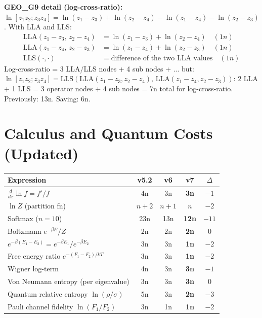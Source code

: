 \documentclass[11pt]{article}
\newcommand{\imp}[1]{\textcolor{imp}{\textbf{#1}}}
\begin{document}
\noindent \textbf{GEO\_G9 detail (log-cross-ratio):}
$\ln[z_1z_2;z_3z_4] = \ln(z_1-z_3) + \ln(z_2-z_4) - \ln(z_1-z_4) - \ln(z_2-z_3)$.
With LLA and LLS:
\begin{align*}
  \mathrm{LLA}(z_1-z_3,\, z_2-z_4) &= \ln(z_1-z_3) + \ln(z_2-z_4) \quad (1n) \\
  \mathrm{LLA}(z_1-z_4,\, z_2-z_3) &= \ln(z_1-z_4) + \ln(z_2-z_3) \quad (1n) \\
  \mathrm{LLS}(\cdot, \cdot) &= \text{difference of the two LLA values} \quad (1n)
\end{align*}
Log-cross-ratio = 3 LLA/LLS nodes + 4 sub nodes + ... but:
$\ln[z_1z_2;z_3z_4] = \mathrm{LLS}(\mathrm{LLA}(z_1-z_3, z_2-z_4),\, \mathrm{LLA}(z_1-z_4, z_2-z_3))$:
2 LLA + 1 LLS = 3 operator nodes + 4 sub nodes = 7n total for log-cross-ratio.
Previously: 13n. Saving: 6n.

\section{Calculus and Quantum Costs (Updated)}
\label{sec:calculus}

\begin{center}
\begin{tabular}{lcccc}
\toprule
Expression & v5.2 & v6 & v7 & $\Delta$ \\
\midrule
$\frac{d}{dx}\ln f = f'/f$      & 4n & 3n & \imp{3n} & $-1$ \\
$\ln Z$ (partition fn)          & $n+2$ & $n+1$ & \imp{$n$} & $-2$ \\
Softmax ($n=10$)                & 23n & 13n & \imp{12n} & $-11$ \\
Boltzmann $e^{-\beta E}/Z$      & 2n & 2n & \imp{2n} & $0$ \\
$e^{-\beta(E_1-E_2)} = e^{-\beta E_1}/e^{-\beta E_2}$ & 3n & 3n & \imp{1n} & $-2$ \\
Free energy ratio $e^{-(F_1-F_2)/kT}$ & 3n & 3n & \imp{1n} & $-2$ \\
Wigner log-term                 & 4n & 3n & \imp{3n} & $-1$ \\
Von Neumann entropy (per eigenvalue) & 3n & 3n & \imp{3n} & $0$ \\
Quantum relative entropy $\ln(\rho/\sigma)$ & 5n & 3n & \imp{2n} & $-3$ \\
Pauli channel fidelity $\ln(F_1/F_2)$ & 3n & 1n & \imp{1n} & $-2$ \\
\bottomrule
\end{tabular}
\end{center}
\end{document}
